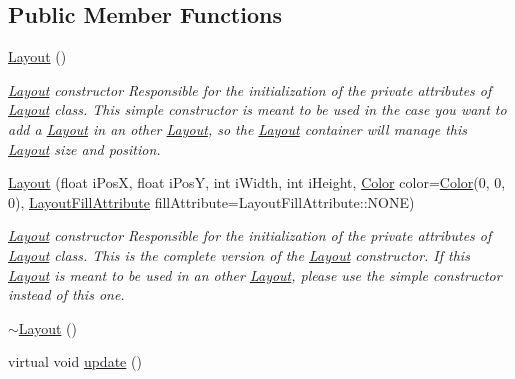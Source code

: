 \subsection*{Public Member Functions}
\begin{DoxyCompactItemize}
\item 
\hyperlink{class_symp_1_1_layout_acd02d4152c342a37567cbbdcec57814f}{Layout} ()
\begin{DoxyCompactList}\small\item\em \hyperlink{class_symp_1_1_layout}{Layout} constructor Responsible for the initialization of the private attributes of \hyperlink{class_symp_1_1_layout_acd02d4152c342a37567cbbdcec57814f}{Layout} class. This simple constructor is meant to be used in the case you want to add a \hyperlink{class_symp_1_1_layout_acd02d4152c342a37567cbbdcec57814f}{Layout} in an other \hyperlink{class_symp_1_1_layout_acd02d4152c342a37567cbbdcec57814f}{Layout}, so the \hyperlink{class_symp_1_1_layout_acd02d4152c342a37567cbbdcec57814f}{Layout} container will manage this \hyperlink{class_symp_1_1_layout_acd02d4152c342a37567cbbdcec57814f}{Layout} size and position. \end{DoxyCompactList}\item 
\hyperlink{class_symp_1_1_layout_a5aa32fa1772ee96bd36432a78bc69aaa}{Layout} (float i\-Pos\-X, float i\-Pos\-Y, int i\-Width, int i\-Height, \hyperlink{struct_symp_1_1_color}{Color} color=\hyperlink{struct_symp_1_1_color}{Color}(0, 0, 0), \hyperlink{namespace_symp_a30499696a7501e2c08fdf0b3094484fb}{Layout\-Fill\-Attribute} fill\-Attribute=Layout\-Fill\-Attribute\-::\-N\-O\-N\-E)
\begin{DoxyCompactList}\small\item\em \hyperlink{class_symp_1_1_layout}{Layout} constructor Responsible for the initialization of the private attributes of \hyperlink{class_symp_1_1_layout_acd02d4152c342a37567cbbdcec57814f}{Layout} class. This is the complete version of the \hyperlink{class_symp_1_1_layout_acd02d4152c342a37567cbbdcec57814f}{Layout} constructor. If this \hyperlink{class_symp_1_1_layout_acd02d4152c342a37567cbbdcec57814f}{Layout} is meant to be used in an other \hyperlink{class_symp_1_1_layout_acd02d4152c342a37567cbbdcec57814f}{Layout}, please use the simple constructor instead of this one. \end{DoxyCompactList}\item 
\hyperlink{class_symp_1_1_layout_a87402d517389b707ccc4cdbb06645ea5}{$\sim$\-Layout} ()
\item 
virtual void \hyperlink{class_symp_1_1_layout_a34a3df4f1637d1a95015e19a1ecf7fb4}{update} ()

\end{DoxyCompactItemize}
